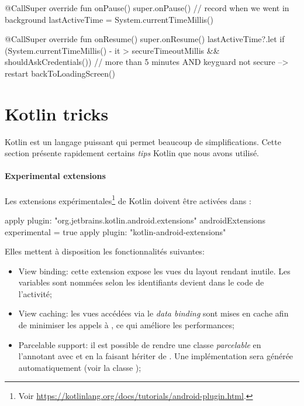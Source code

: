 \begin{kotlincode}
@CallSuper
override fun onPause() {
    super.onPause()
    // record when we went in background
    lastActiveTime = System.currentTimeMillis()
}

@CallSuper
override fun onResume() {
    super.onResume()
    lastActiveTime?.let {
        if (System.currentTimeMillis() - it > secureTimeoutMillis && 
                shouldAskCredentials()){
            // more than 5 minutes AND keyguard not secure --> restart
            backToLoadingScreen()
        }
    }  
}
\end{kotlincode}

\section{Kotlin tricks}

Kotlin est un langage puissant qui permet beaucoup de simplifications. Cette section présente rapidement certains \emph{tips} Kotlin que nous avons utilisé.

\paragraph*{Experimental extensions} Les extensions expérimentales\footnote{Voir \url{https://kotlinlang.org/docs/tutorials/android-plugin.html}.} de Kotlin doivent être activées dans :

\begin{javacode}
apply plugin: "org.jetbrains.kotlin.android.extensions"
androidExtensions {
    experimental = true
} 
apply plugin: "kotlin-android-extensions"
\end{javacode}

Elles mettent à disposition les fonctionnalités suivantes:
\begin{itemize}
    \item View binding: cette extension expose les vues du layout rendant  inutile. Les variables sont nommées selon les identifiants  devient  dans le code de l'activité; 
    \item View caching: les vues accédées via le \emph{data binding} sont mises en cache afin de minimiser les appels à , ce qui améliore les performances;
    \item Parcelable support: il est possible de rendre une classe \emph{parcelable} en l'annotant avec  et en la faisant hériter de . Une implémentation sera générée automatiquement (voir la classe ); 
\end{itemize}

